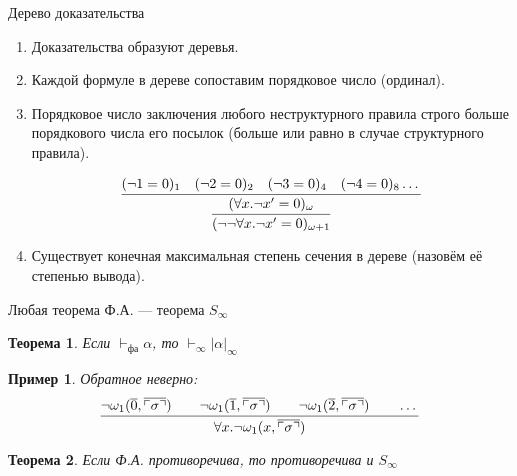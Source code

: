 \documentclass[aspectratio=169]{beamer}
\newtheorem{thm}{Теорема}[section]
\newtheorem{exm}{Пример}[section]
\begin{document}
\begin{frame}{Дерево доказательства}
\begin{enumerate}
\item Доказательства образуют деревья.
\item Каждой формуле в дереве сопоставим порядковое число (ординал).
\item Порядковое число заключения любого неструктурного правила строго больше порядкового числа его посылок
(больше или равно в случае структурного правила).


$$\infer{(\neg\neg\forall x.\neg x'=0)_{\omega+1}}{\infer{(\forall x.\neg x' = 0)_\omega}{(\neg 1=0)_1\quad (\neg 2=0)_2 \quad (\neg 3=0)_4 \quad (\neg 4 = 0)_8 \dots}}$$

\item Существует конечная максимальная степень сечения в дереве (назовём её степенью вывода).
\end{enumerate}
\end{frame}

\begin{frame}{Любая теорема Ф.А. --- теорема $S_\infty$}
\begin{thm}Если $\vdash_\text{фа}\alpha$, то $\vdash_\infty|\alpha|_\infty$ \end{thm}
\begin{exm}Обратное неверно: $$\infer{\forall x.\neg\omega_1(x,\overline{\ulcorner\sigma\urcorner})}
{\neg\omega_1(\overline{0},\overline{\ulcorner\sigma\urcorner})\quad\quad
 \neg\omega_1(\overline{1},\overline{\ulcorner\sigma\urcorner})\quad\quad
 \neg\omega_1(\overline{2},\overline{\ulcorner\sigma\urcorner})\quad\quad\dots}$$
\end{exm}
\begin{thm}Если Ф.А. противоречива, то противоречива и $S_\infty$\end{thm}
\end{frame}
\end{document}
